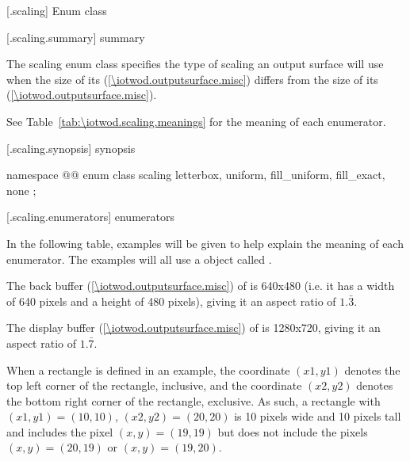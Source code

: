  [\iotwod.scaling] {Enum class }

 [\iotwod.scaling.summary] { summary}

\pnum
The scaling enum class specifies the type of scaling an output surface 
will use when the size of its  (\ref{\iotwod.outputsurface.misc}) differs from the size of its  (\ref{\iotwod.outputsurface.misc}).

\pnum
See Table~\ref{tab:\iotwod.scaling.meanings} for the meaning of each  enumerator.

 [\iotwod.scaling.synopsis] { synopsis}

\begin{codeblock}
namespace @\fullnamespace{}@ {
  enum class scaling {
    letterbox,
    uniform,
    fill_uniform,
    fill_exact,
    none
  };
}
\end{codeblock}

 [\iotwod.scaling.enumerators] { enumerators}

\pnum
\begin{note}
In the following table, examples will be given to help explain the meaning of each enumerator. The examples will all use a  object called .

The back buffer (\ref{\iotwod.outputsurface.misc}) of  is 640x480 (i.e. it has a width of 640 pixels and a height of 480 pixels), giving it an aspect ratio of $1.\bar{3}$.

The display buffer (\ref{\iotwod.outputsurface.misc}) of  is 1280x720, giving it an aspect ratio of $1.\bar{7}$.

When a rectangle is defined in an example, the coordinate $(x1,y1)$ denotes the top left corner of the rectangle, inclusive, and the coordinate $(x2,y2)$ denotes the bottom right corner of the rectangle, exclusive. As such, a rectangle with $(x1,y1) = (10,10)$, $(x2,y2) = (20, 20)$ is 10 pixels wide and 10 pixels tall and includes the pixel $(x,y) = (19,19)$ but does not include the pixels $(x,y) = (20,19)$ or $(x,y) = (19,20)$.
\end{note}

